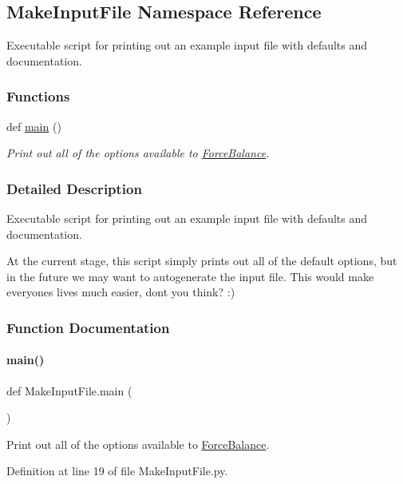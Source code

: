 \hypertarget{namespaceMakeInputFile}{}\subsection{Make\+Input\+File Namespace Reference}
\label{namespaceMakeInputFile}


Executable script for printing out an example input file with defaults and documentation.  


\subsubsection*{Functions}
\begin{DoxyCompactItemize}
\item 
def \hyperlink{namespaceMakeInputFile_a594be2d3eaf35f633ba4704f35132b02}{main} ()
\begin{DoxyCompactList}\small\item\em Print out all of the options available to \hyperlink{namespaceForceBalance}{Force\+Balance}. \end{DoxyCompactList}\end{DoxyCompactItemize}


\subsubsection{Detailed Description}
Executable script for printing out an example input file with defaults and documentation. 

At the current stage, this script simply prints out all of the default options, but in the future we may want to autogenerate the input file. This would make everyone\textquotesingle{}s lives much easier, don\textquotesingle{}t you think? \+:) 

\subsubsection{Function Documentation}
\mbox{\label{namespaceMakeInputFile_a594be2d3eaf35f633ba4704f35132b02}} 
\paragraph{\texorpdfstring{main()}{main()}}
{\footnotesize\ttfamily def Make\+Input\+File.\+main (\begin{DoxyParamCaption}{ }\end{DoxyParamCaption})}



Print out all of the options available to \hyperlink{namespaceForceBalance}{Force\+Balance}. 



Definition at line 19 of file Make\+Input\+File.\+py.

